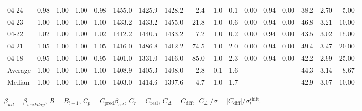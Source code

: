 \begin{threeparttable}
{\begin{tabular}{lrrrrrrrrrrrrrrrr}
  04-24 &         0.98 &           1.00 &          1.00 &          0.98 & 1455.0 & 1425.9 & 1428.2 &       -2.4 &                     -1.0 &                 0.1 &       0.00 &      0.94 &           0.00 &             38.2 &            2.70 &                   5.00 \\
  04-23 &         1.00 &           1.00 &          1.00 &          1.00 & 1433.2 & 1433.2 & 1455.0 &      -21.8 &                     -1.0 &                 0.6 &       0.00 &      0.94 &           0.00 &             46.8 &            3.21 &                  10.00 \\
  04-22 &         1.02 &           1.00 &          1.00 &          1.02 & 1412.2 & 1440.5 & 1433.2 &        7.2 &                      1.0 &                 0.2 &       0.00 &      0.94 &           0.00 &             43.5 &            3.02 &                  15.00 \\
  04-21 &         1.05 &           1.00 &          1.00 &          1.05 & 1416.0 & 1486.8 & 1412.2 &       74.5 &                      1.0 &                 2.0 &       0.00 &      0.94 &           0.00 &             49.4 &            3.47 &                  20.00 \\
  04-18 &         0.95 &           1.00 &          1.00 &          0.95 & 1401.0 & 1331.0 & 1416.0 &      -85.0 &                     -1.0 &                 2.3 &       0.00 &      0.94 &           0.00 &             42.2 &            2.99 &                  25.00 \\
Average &         1.00 &           1.00 &          1.00 &          1.00 & 1408.9 & 1405.3 & 1408.0 &       -2.8 &                     -0.1 &                 1.6 &         -- &        -- &             -- &             44.3 &            3.14 &                   8.67 \\
 Median &         1.00 &           1.00 &          1.00 &          1.00 & 1403.0 & 1414.6 & 1397.6 &       -4.7 &                     -1.0 &                 1.7 &         -- &        -- &             -- &             42.9 &            3.07 &                  10.00 \\
\bottomrule
\end{tabular}
}
\begin{tablenotes}\footnotesize
\item $\beta_{wd}=\beta_{weekday}$, $B=B_{t-1}$,
$C_p=C_{\text{pred}}\beta_{evt}$, $C_r=C_{\text{real}}$,
$C_\Delta=C_{\text{diff}}$, $|C_\Delta|/\sigma=|C_{\text{diff}}|/\sigma_t^{\text{shift}}$.
\end{tablenotes}
\end{threeparttable}
\endgroup
